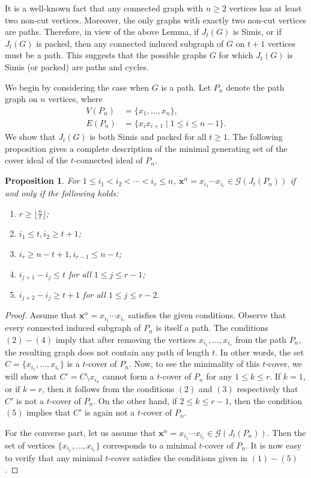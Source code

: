 \documentclass[12pt]{amsart}
\newtheorem{proposition}{Proposition}[section]
\begin{document}
It is a well-known fact that any connected graph with $n\geq 2$ vertices has at least two non-cut vertices. Moreover, the only graphs with exactly two non-cut vertices are paths. Therefore, in view of the above Lemma, if $J_t(G)$ is Simis, or if $J_t(G)$ is packed, then any connected induced subgraph of $G$ on $t+1$ vertices must be a path. This suggests that the possible graphs $G$ for which $J_t(G)$ is Simis (or packed) are paths and cycles.

We begin by considering the case when $G$ is a path. Let $P_n$ denote the path graph on $n$ vertices, where 
\begin{align*}
    V(P_n)&=\{x_1,\dots , x_n\},\\
    E(P_n)&=\{x_ix_{i+1}\mid 1\leq i\leq n-1\}.
\end{align*}
We show that $J_t(G)$ is both Simis and packed for all $t\geq 1$.
The following proposition gives a complete description of the minimal generating set of the cover ideal of the $t$-connected ideal of $P_n$.

\begin{proposition}\label{prop: mingens of J_t(P_n)}
    For $1\leq i_1<i_2<\cdots < i_r\leq n$, $\mathbf{x}^{\alpha}=x_{i_1}\cdots x_{i_r}\in \mathcal{G}(J_t(P_n))$ if and only if the following holds:
    \begin{enumerate}
        \item $r\geq \lfloor \frac{n}{t} \rfloor$;
        \item $i_1\leq t, i_2\geq t+1$;
        \item $i_r\geq n-t+1, i_{r-1}\leq n-t$;
        \item $i_{j+1}-i_{j}\leq t$ for all $1\leq j \leq r-1$;
        \item $i_{j+2}-i_{j}\geq t+1$ for all $1\leq j\leq r-2$.
    \end{enumerate}
\end{proposition}
\begin{proof}
    Assume that $\mathbf{x}^{\alpha}=x_{i_1}\cdots x_{i_r}$ satisfies the given conditions. Observe that every connected induced subgraph of $P_n$ is itself a path. The conditions $(2)-(4)$ imply that after removing the vertices $x_{i_1}, \dots , x_{i_r}$ from the path $P_n$, the resulting graph does not contain any path of length $t$. In other words, the set $C=\{x_{i_1}, \dots , x_{i_r}\}$ is a $t$-cover of $P_n$. Now, to see the minimality of this $t$-cover, we will show that $C'=C\setminus x_{i_k}$ cannot form a $t$-cover of $P_n$ for any $1\leq k\leq r$. If $k=1$, or if $k=r$, then it follows from the conditions $(2)$ and $(3)$ respectively that $C'$ is not a $t$-cover of $P_n$. On the other hand, if $2\leq k\leq r-1$, then the condition $(5)$ implies that $C'$ is again not a $t$-cover of $P_n$.

    For the converse part, let us assume that $\mathbf{x}^{\alpha}=x_{i_1}\cdots x_{i_r}\in \mathcal{G}(J_t(P_n))$. Then the set of vertices $\{x_{i_1}, \dots , x_{i_r}\}$ corresponds to a minimal $t$-cover of $P_n$. It is now easy to verify that any minimal $t$-cover satisfies the conditions given in $(1)-(5)$.
\end{proof}
\end{document}

